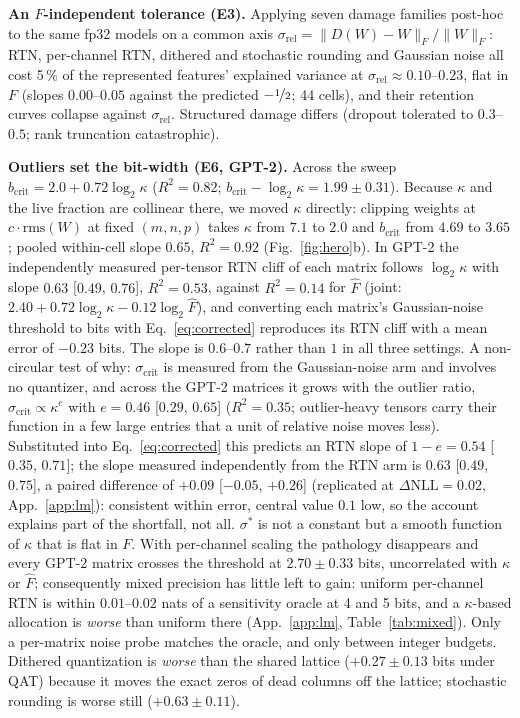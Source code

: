 \documentclass{article}
\begin{document}
\textbf{An $F$-independent tolerance (E3).} Applying seven damage families post-hoc to the same fp32 models on a common axis
$\sigma_{\mathrm{rel}} = \lVert D(W)-W\rVert_F/\lVert W\rVert_F$: RTN, per-channel RTN, dithered and stochastic rounding
and Gaussian noise all cost 5\,\% of the represented features' explained variance at $\sigma_{\mathrm{rel}}\approx
0.10$--$0.23$, flat in $F$ (slopes $0.00$--$0.05$ against the predicted $-\nicefrac12$; 44 cells), and their retention
curves collapse against $\sigma_{\mathrm{rel}}$. Structured damage differs (dropout tolerated to $0.3$--$0.5$; rank truncation catastrophic).

\textbf{Outliers set the bit-width (E6, GPT-2).} Across the sweep $b_{\mathrm{crit}} = 2.0+0.72\log_2\kappa$ ($R^2 = 0.82$;
$b_{\mathrm{crit}}-\log_2\kappa = 1.99\pm0.31$). Because $\kappa$ and the live fraction are collinear there, we moved
$\kappa$ directly: clipping weights at $c\cdot\mathrm{rms}(W)$ at fixed $(m,n,p)$ takes $\kappa$ from $7.1$ to $2.0$ and
$b_{\mathrm{crit}}$ from $4.69$ to $3.65$; pooled within-cell slope $0.65$, $R^2=0.92$ (Fig.~\ref{fig:hero}b).
In GPT-2 the independently measured per-tensor RTN cliff of each matrix follows $\log_2\kappa$ with slope $0.63$
[$0.49$, $0.76$], $R^2 = 0.53$, against $R^2=0.14$ for $\hat F$ (joint: $2.40+0.72\log_2\kappa-0.12\log_2\hat F$), and
converting each matrix's Gaussian-noise threshold to bits with Eq.~\eqref{eq:corrected} reproduces its RTN cliff with a
mean error of $-0.23$ bits. The slope is $0.6$--$0.7$ rather than $1$ in all three settings. A non-circular test of why: $\sigma_{\mathrm{crit}}$ is
measured from the Gaussian-noise arm and involves no quantizer, and across the GPT-2 matrices it grows with the outlier
ratio, $\sigma_{\mathrm{crit}}\propto\kappa^{e}$ with $e = 0.46$ [$0.29$, $0.65$] ($R^2=0.35$; outlier-heavy tensors carry
their function in a few large entries that a unit of relative noise moves less). Substituted into
Eq.~\eqref{eq:corrected} this predicts an RTN slope of $1-e = 0.54$ [$0.35$, $0.71$]; the slope measured independently
from the RTN arm is $0.63$ [$0.49$, $0.75$], a paired difference of $+0.09$ [$-0.05$, $+0.26$] (replicated at $\Delta\mathrm{NLL}=0.02$, App.~\ref{app:lm}):
consistent within error, central value $0.1$ low, so the account explains part of the shortfall, not all. $\sigma^*$ is
not a constant but a smooth function of $\kappa$ that is flat in $F$. With per-channel scaling the pathology
disappears and every GPT-2 matrix crosses the threshold at $2.70\pm0.33$ bits, uncorrelated with $\kappa$ or $\hat F$;
consequently mixed precision has little left to gain: uniform per-channel RTN is within $0.01$--$0.02$ nats of a
sensitivity oracle at 4 and 5 bits, and a $\kappa$-based allocation is \emph{worse} than uniform there (App.~\ref{app:lm},
Table~\ref{tab:mixed}). Only a per-matrix noise probe matches the oracle, and only between integer budgets. Dithered quantization is \emph{worse} than the shared lattice ($+0.27\pm0.13$ bits under QAT) because it moves
the exact zeros of dead columns off the lattice; stochastic rounding is worse still ($+0.63\pm0.11$).
\end{document}
